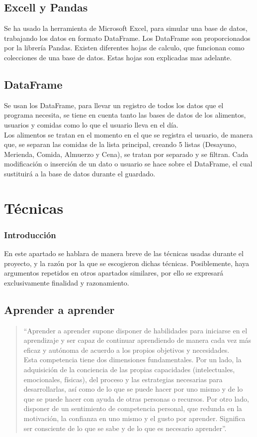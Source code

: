 \subsection{Excell y Pandas}
Se ha usado la herramienta de Microsoft Excel, para simular una base de datos, trabajando los datos en formato DataFrame. Los DataFrame son proporcionados por la librería Pandas. Existen diferentes hojas de calculo, que funcionan como colecciones de una base de datos. Estas hojas son explicadas mas adelante.
\subsection{DataFrame}
Se usan los DataFrame, para llevar un registro de todos los datos que el programa necesita, se tiene en cuenta tanto las bases de datos de los alimentos, usuarios y comidas como lo que el usuario lleva en el día.
\\
Los alimentos se tratan en el momento en el que se registra el usuario, de manera que, se separan las comidas de la lista principal, creando 5 listas (Desayuno, Merienda, Comida, Almuerzo y Cena), se tratan por separado y se filtran. Cada modificación o inserción de un dato o usuario se hace sobre el DataFrame, el cual sustituirá a la base de datos durante el guardado.

\section{Técnicas}
\subsubsection{Introducción}
En este apartado se hablara de manera breve de las técnicas usadas durante el proyecto, y la razón por la que se escogieron dichas técnicas. Posiblemente, haya argumentos repetidos en otros apartados similares, por ello se expresará exclusivamente finalidad y razonamiento.
\subsection{Aprender a aprender}
\begin{quote}
“Aprender a aprender supone disponer de habilidades para iniciarse en el aprendizaje y ser capaz de continuar aprendiendo de manera cada vez más eficaz y autónoma de acuerdo a los propios objetivos y necesidades.\\

Esta competencia tiene dos dimensiones fundamentales. Por un lado, la adquisición de la conciencia de las propias capacidades (intelectuales, emocionales, físicas), del proceso y las estrategias necesarias para desarrollarlas, así como de lo que se puede hacer por uno mismo y de lo que se puede hacer con ayuda de otras personas o recursos. Por otro lado, disponer de un sentimiento de competencia personal, que redunda en la motivación, la confianza en uno mismo y el gusto por aprender. Significa ser consciente de lo que se sabe y de lo que es necesario aprender”. \cite{aprederAAprender}


\end{quote}

